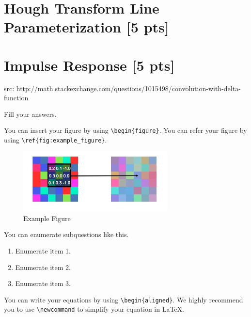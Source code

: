 \documentclass[12pt,a4paper]{article}
\begin{document}
\section{Hough Transform Line Parameterization [5 pts]}


\section{Impulse Response [5 pts]}

src: http://math.stackexchange.com/questions/1015498/convolution-with-delta-function





Fill your answers.

You can insert your figure by using \verb|\begin{figure}|.
You can refer your figure by using \verb|\ref{fig:example_figure}|.

\begin{figure}[!h]
    \begin{center}
        \includegraphics[width=0.7\textwidth]{assets/fig1.png}
        \caption{Example Figure}
        \label{fig:example_figure}
    \end{center}
\end{figure}

You can enumerate subquestions like this.

\begin{enumerate}
    \item Enumerate item 1.
    \item Enumerate item 2.
    \item Enumerate item 3.
\end{enumerate}

You can write your equations by using \verb|\begin{aligned}|.
We highly recommend you to use \verb|\newcommand| to simplify your equation in \LaTeX.
\end{document}
